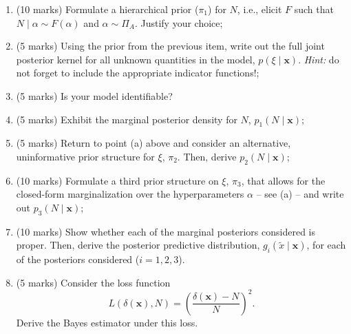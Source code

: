 \documentclass[a4paper,10pt, notitlepage]{report}
\begin{document}
\begin{enumerate}[label=\alph*)]
 \item (10 marks) Formulate a hierarchical prior ($\pi_1$) for $N$, i.e., elicit $F$ such that $N \mid \alpha \sim F(\alpha)$ and $\alpha  \sim \Pi_A$.
 Justify your choice; 

 

 \item (5 marks) Using the prior from the previous item, write out the full joint posterior kernel for all unknown quantities in the model, $p(\xi \mid \boldsymbol{x})$. \textit{Hint:} do not forget to include the appropriate indicator functions!;
 
 

 \item (5 marks) Is your model identifiable?
 
 

 \item (5 marks) Exhibit the marginal posterior density for $N$, $p_1(N \mid \boldsymbol{x})$;
 
  

 \item (5 marks) Return to point (a) above and consider an alternative, uninformative prior structure for $\xi$, $\pi_2$.
 Then, derive $p_2(N \mid \boldsymbol{x})$;

 

 \item (10 marks) Formulate a third prior structure on $\xi$, $\pi_3$, that allows for the closed-form marginalization over the hyperparameters $\alpha$ -- see (a) -- and write out $p_3(N \mid \boldsymbol{x})$;
 
 

 \item (10 marks) Show whether each of the marginal posteriors considered is proper.
 Then, derive the posterior predictive distribution, $g_i(\tilde{x} \mid
 \boldsymbol{x})$, for each of the posteriors considered ($i = 1, 2, 3$).
    
  

 \item (5 marks) Consider the loss function
 \begin{equation}
 \label{eq:relative_loss}
  L(\delta(\boldsymbol{x}), N) = \left(\frac{\delta(\boldsymbol{x})-N}{N} \right)^2.
 \end{equation}
 Derive the Bayes estimator under this loss.

 

\end{enumerate}
\end{document}
